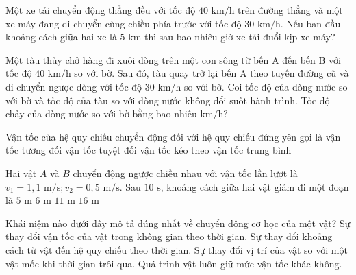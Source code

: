 \begin{ex}
Một xe tải chuyển động thẳng đều với tốc độ $40\text{ km/h}$ trên đường thẳng và một xe máy đang di chuyển cùng chiều phía trước với tốc độ $30\text{ km/h}$. Nếu ban đầu khoảng cách giữa hai xe là $5\text{ km}$ thì sau bao nhiêu giờ xe tải đuổi kịp xe máy?
\end{ex}

\begin{ex}
Một tàu thủy chở hàng đi xuôi dòng trên một con sông từ bến A đến bến B với tốc độ $40\text{ km/h}$ so với bờ. Sau đó, tàu quay trở lại bến A theo tuyến đường cũ và di chuyển ngược dòng với tốc độ $30\text{ km/h}$ so với bờ. Coi tốc độ của dòng nước so với bờ và tốc độ của tàu so với dòng nước không đổi suốt hành trình. Tốc độ chảy của dòng nước so với bờ bằng bao nhiêu $\text{km/h}$?
\end{ex}
\begin{ex}
Vận tốc của hệ quy chiếu chuyển động đối với hệ quy chiếu đứng yên gọi là
\choice
{vận tốc tương đối}
{vận tốc tuyệt đối}
{\True vận tốc kéo theo}
{vận tốc trung bình}
\end{ex}

\begin{ex}
Hai vật $A$ và $B$ chuyển động ngược chiều nhau với vận tốc lần lượt là $v_1 = 1,1\text{ m/s}; v_2 = 0,5\text{ m/s}$. Sau $10\text{ s}$, khoảng cách giữa hai vật giảm đi một đoạn là
\choice
{$5\text{ m}$}
{$6\text{ m}$}
{$11\text{ m}$}
{\True $16\text{ m}$}
\end{ex}
\begin{ex}
[ĐTH] Khái niệm nào dưới đây mô tả đúng nhất về chuyển động cơ học của một vật?
\choice
{Sự thay đổi vận tốc của vật trong không gian theo thời gian.}
{Sự thay đổi khoảng cách từ vật đến hệ quy chiếu theo thời gian.}
{\True Sự thay đổi vị trí của vật so với một vật mốc khi thời gian trôi qua.}
{Quá trình vật luôn giữ mức vận tốc khác không.}
\end{ex}
